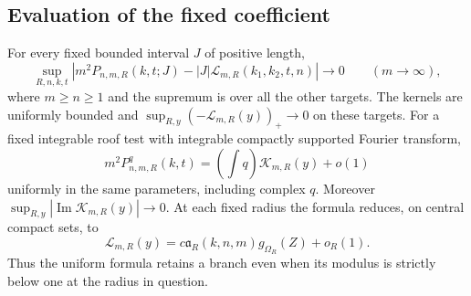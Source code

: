\subsection{Evaluation of the fixed coefficient}
\begin{theorem}
\label{thm:v41-uniform-transition}
For every fixed bounded interval $J$ of positive length,
\begin{equation}\label{eq:v41-uniform-interval}
 \sup_{R,n,k,t}
 \left|m^2P_{n,m,R}(k,t;J)-|J|\mathcal L_{m,R}(k_1,k_2,t,n)\right|
                         \longrightarrow0\qquad(m\to\infty),
\end{equation}
where $m\ge n\ge1$ and the supremum is over all the other targets.
The kernels are uniformly bounded and
$\sup_{R,y}(-\mathcal L_{m,R}(y))_+\to0$ on these targets.
For a fixed integrable roof test with integrable compactly supported
Fourier transform,
\begin{equation}\label{eq:v41-uniform-test}
 m^2P^q_{n,m,R}(k,t)=\left(\int q\right)\mathcal K_{m,R}(y)+o(1)
\end{equation}
uniformly in the same parameters, including complex $q$. Moreover
$\sup_{R,y}|\operatorname{Im}\mathcal K_{m,R}(y)|\to0$.
At each fixed radius the formula reduces, on central compact sets, to
\[
 \mathcal L_{m,R}(y)
       =c\mathfrak a_R(k,n,m)g_{\Omega_R}(Z)+o_R(1).
\]
Thus the uniform formula retains a branch even when its modulus is
strictly below one at the radius in question.
\end{theorem}
